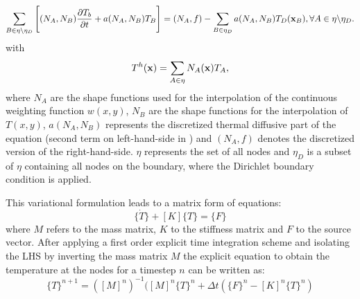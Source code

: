\begin{equation}
	\sum_{B \in \eta \backslash \eta_D} \Bigg[(N_A,N_B) \frac{\partial T_b}{\partial t} + a(N_A,N_B)T_B \Bigg] = (N_A,f) - \sum_{B \in \eta_D} a(N_A,N_B)T_D(\boldsymbol{\mathbf{x}}_B), \forall A \in \eta \backslash \eta_D .
\end{equation}
with
\begin{equation}
	T^h(\boldsymbol{\mathbf{x}}) = \sum_{A\in \eta}N_A(\boldsymbol{\mathbf{x}})T_A ,
\end{equation}
where $N_A$ are the shape functions used for the interpolation of the continuous weighting function $w(x,y)$, $N_B$ are the shape functions for the interpolation of $T(x,y)$, $a(N_A, N_B)$ represents the discretized thermal diffusive part of the equation (second term on left-hand-side in ) and $(N_A,f)$ denotes the discretized version of the right-hand-side. $\eta$ represents the set of all nodes and $\eta_D$ is a subset of $\eta$ containing all nodes on the boundary, where the Dirichlet boundary condition is applied.

This variational formulation leads to a matrix form of equations:
\begin{equation}
	[M] \Big\{ \dot{T} \Big\} + [K] \Big\{ T \Big\} = \Big\{ F \Big\} 
\end{equation}
where $M$ refers to the mass matrix, $K$ to the stiffness matrix and $F$ to the source vector. After applying a first order explicit time integration scheme and isolating the LHS by inverting the mass matrix $M$ the explicit equation to obtain the temperature at the nodes for a timestep $n$ can be written as:
\begin{equation}
	\label{eq:LHS}
	\{T\}^{n+1} = ([M]^n)^{-1}([M]^n\{T\}^n + \Delta t(\{F\}^n-[K]^n\{T\}^n)
\end{equation}


